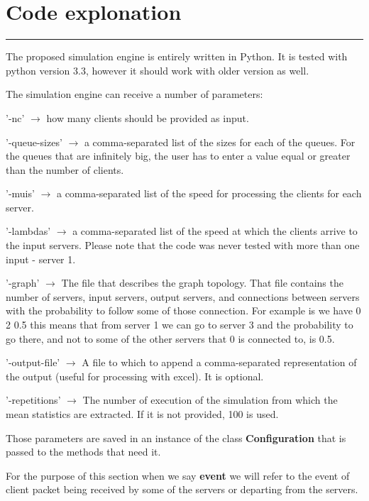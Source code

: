 \documentclass[12pt]{article}
\newcommand{\hr}{\rule{\linewidth}{0.1mm}}
\newenvironment{itemize*}{
  \begin{itemize}
    \setlength{\itemsep}{0pt}
    \setlength{\parskip}{0pt}
    \setlength{\parsep}{0pt}
}{
  \end{itemize}
}
\theoremstyle{plain}
\begin{document}
\section*{\centering
  Code explonation
}

\hr

The proposed simulation engine is entirely written in Python. It is tested with
python version 3.3, however it should work with older version as well.

The simulation engine can receive a number of parameters: 
\begin{itemize*}
  \item '-nc' $\rightarrow$ how many clients should be provided as input.
  \item '-queue-sizes' $\rightarrow$ a comma-separated list of the sizes for
    each of the queues. For the queues that are infinitely big, the user has to
    enter a value equal or greater than the number of clients.
  \item '-muis' $\rightarrow$ a comma-separated list of the speed for
    processing the clients for each server.
  \item '-lambdas' $ \rightarrow $ a comma-separated list of the speed at which
    the clients arrive to the input servers. Please note that the code was
    never tested with more than one input - server 1.
  \item '-graph' $ \rightarrow $ The file that describes the graph topology.
    That file contains the number of servers, input servers, output servers,
    and connections between servers with the probability to follow some of 
    those connection. For example is we have 0 2 0.5 this means that from 
    server 1 we can go to server 3 and the probability to go there, and not to
    some of the other servers that 0 is connected to, is 0.5.
  \item '-output-file' $ \rightarrow $ A file to which to append a
    comma-separated representation of the output (useful for processing with
    excel). It is optional.  
  \item '-repetitions' $ \rightarrow $ The number of execution of the simulation
    from which the mean statistics are extracted. If it is not provided, 100 is
    used.
\end{itemize*}

Those parameters are saved in an instance of the class \textbf{Configuration}
that is passed to the methods that need it.

For the purpose of this section when we say \textbf{event} we will refer to the
event of client packet being received by some of the servers or departing from
the servers.
\end{document}
